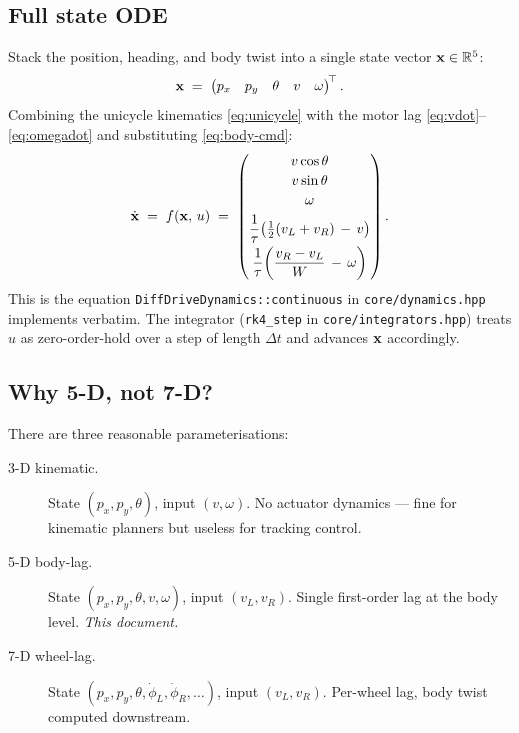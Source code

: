 \subsection{Full state ODE}

Stack the position, heading, and body twist into a single state vector $\mathbf{x} \in \mathbb{R}^{5}$:
\begin{equation}
    \mathbf{x} \;=\; \begin{pmatrix} p_x & p_y & \theta & v & \omega \end{pmatrix}^{\!\top}.
\end{equation}
Combining the unicycle kinematics \eqref{eq:unicycle} with the motor lag \eqref{eq:vdot}--\eqref{eq:omegadot} and substituting \eqref{eq:body-cmd}:
\begin{equation}
    \dot {\mathbf{x}} \;=\; f(\mathbf{x},\, u) \;=\;
    \begin{pmatrix}
        v \cos\theta \\[2pt]
        v \sin\theta \\[2pt]
        \omega \\[4pt]
        \dfrac{1}{\tau}\!\left(\tfrac{1}{2}(v_L + v_R) \,-\, v\right) \\[6pt]
        \dfrac{1}{\tau}\!\left(\dfrac{v_R - v_L}{W} \,-\, \omega\right)
    \end{pmatrix}.
    \label{eq:state-ode}
\end{equation}
This is the equation \texttt{DiffDriveDynamics::continuous} in \texttt{core/dynamics.hpp} implements verbatim. The integrator (\texttt{rk4\_step} in \texttt{core/integrators.hpp}) treats $u$ as zero-order-hold over a step of length $\Delta t$ and advances $\mathbf{x}$ accordingly.

\subsection{Why 5-D, not 7-D?}

There are three reasonable parameterisations:

\begin{description}
    \item[3-D kinematic.] State $(p_x, p_y, \theta)$, input $(v, \omega)$. No actuator dynamics --- fine for kinematic planners but useless for tracking control.
    \item[5-D body-lag.] State $(p_x, p_y, \theta, v, \omega)$, input $(v_L, v_R)$. Single first-order lag at the body level. \emph{This document.}
    \item[7-D wheel-lag.] State $(p_x, p_y, \theta, \dot\phi_L, \dot\phi_R, \ldots)$, input $(v_L, v_R)$. Per-wheel lag, body twist computed downstream.
\end{description}


